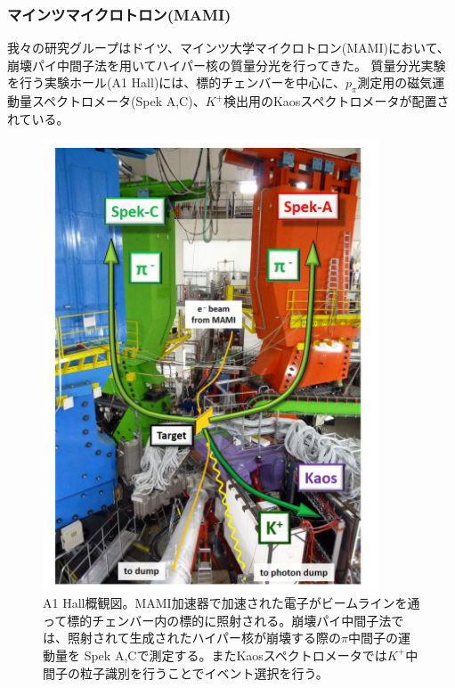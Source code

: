 \documentclass[a4paper,11pt,uplatex]{jsbook}
\begin{document}
\subsubsection{マインツマイクロトロン(MAMI)}
我々の研究グループはドイツ、マインツ大学マイクロトロン(MAMI)において、崩壊パイ中間子法を用いてハイパー核の質量分光を行ってきた。
質量分光実験を行う実験ホール(A1 Hall)には、標的チェンバーを中心に、$p_\pi$測定用の磁気運動量スペクトロメータ(Spek A,C)、$K^+$検出用のKaosスペクトロメータが配置されている。
\begin{figure}[h]
  \centering
  \includegraphics[width=10cm]{image/1-HallA.png}
  \caption[MAMI実験ホール]{A1 Hall概観図。MAMI加速器で加速された電子がビームラインを通って標的チェンバー内の標的に照射される。崩壊パイ中間子法では、照射されて生成されたハイパー核が崩壊する際の$\pi$中間子の運動量を
  Spek A,Cで測定する。またKaosスペクトロメータでは$K^+$中間子の粒子識別を行うことでイベント選択を行う。\cite{esserObservation4Hyperhydrogen2015}}
\end{figure}
\end{document}

